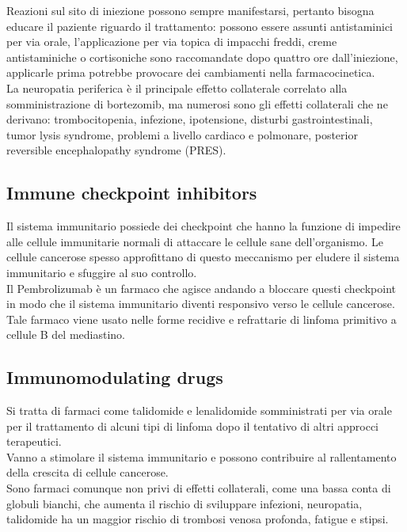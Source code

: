 Reazioni sul sito di iniezione possono sempre manifestarsi, pertanto bisogna educare il paziente riguardo il 
trattamento: possono essere assunti antistaminici per via orale, l’applicazione per via topica di impacchi freddi, 
creme antistaminiche o cortisoniche sono raccomandate dopo quattro ore dall’iniezione, 
applicarle prima potrebbe provocare dei cambiamenti nella farmacocinetica\cite{BORTEZOMIB}.\\
La neuropatia periferica è il principale effetto collaterale correlato alla somministrazione di bortezomib, 
ma numerosi sono gli effetti collaterali che ne derivano: trombocitopenia, infezione, ipotensione, disturbi 
gastrointestinali, tumor lysis syndrome, problemi a livello cardiaco e polmonare, posterior reversible 
encephalopathy syndrome (PRES)\cite{BORTNURSES}.\\ 

\subsection{Immune checkpoint inhibitors}

Il sistema immunitario possiede dei checkpoint che hanno la funzione di impedire alle cellule immunitarie normali di 
attaccare le cellule sane dell’organismo. Le cellule cancerose spesso approfittano di questo meccanismo per eludere il 
sistema immunitario e sfuggire al suo controllo.\\ 
Il Pembrolizumab è un farmaco che agisce andando a bloccare questi checkpoint in modo che il sistema immunitario 
diventi responsivo verso le cellule cancerose. Tale farmaco viene usato nelle forme recidive e refrattarie di linfoma 
primitivo a cellule B del mediastino\cite{IMMUNOTP}.\\

\subsection{Immunomodulating drugs}

Si tratta di farmaci come talidomide e lenalidomide somministrati per via orale per il trattamento di alcuni tipi di 
linfoma dopo il tentativo di altri approcci terapeutici\cite{MASSIVEBIO}.\\ 
Vanno a stimolare il sistema immunitario e possono contribuire al rallentamento della crescita di cellule cancerose.\\
Sono farmaci comunque non privi di effetti collaterali, come una bassa conta di globuli bianchi, che aumenta il 
rischio di sviluppare infezioni, neuropatia, talidomide ha un maggior rischio di trombosi venosa profonda, 
fatigue e stipsi\cite{IMMUNOTP}.\\

